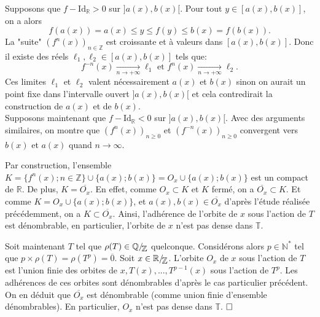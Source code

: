 \documentclass[11pt,a4 paper]{article}
\newcommand{\Tbb}{\mathbb{T}}
\newcommand{\Rbb}{\mathbb{R}}
\newcommand*{\EnsembleQuotient}[2]%
{\ensuremath{%
		#1/\!\raisebox{-.65ex}{\ensuremath{\mathcal{#2}}}}}
\begin{document}
	Supposons que $f - \mathrm{Id_{\mathbb{R}}}>0$ sur $]a(x),b(x)[$. Pour tout $y \in [a(x),b(x)]$, on a alors $$f(a(x))= a(x) \leq y \leq f(y) \leq b(x) =f(b(x)).$$
	La "suite" $(f^n(x))_{n\in \mathbb{Z}}$ est croissante et à valeurs dans $[a(x),b(x)]$. Donc il existe des réels $\ell_1, \ell_2\in [a(x),b(x)]$ tels que: 
	$$f^{-n}(x) \underset{n \to + \infty}{\longrightarrow} \ell_1\text{ et }f^{n}(x) \underset{n \to + \infty}{\longrightarrow} \ell_2.$$
	 Ces limites $\ell_1$ et $\ell_2$ valent nécessairement $a(x)$ et $b(x)$ sinon on aurait un point fixe dans l'intervalle ouvert $]a(x),b(x)[$ et cela contredirait la construction de $a(x)$ et de $b(x)$.\\
	
	Supposons maintenant que $f - \mathrm{Id_{\mathbb{R}}}<0$ sur $]a(x),b(x)[$. Avec des arguments similaires, on montre que $(f^n(x))_{n\geq 0}$ et $(f^{-n}(x))_{n\geq 0}$ convergent vers $b(x)$ et $a(x)$ quand $n \to \infty$.\\
	
	\par Par construction, l'ensemble $K=\lbrace f^n(x); n \in \mathbb{Z}\rbrace \cup \lbrace a(x); b(x)\rbrace = O_x \cup \lbrace a(x); b(x)\rbrace$ est un compact de $\mathbb{R}$. De plus, $K = \overline{O_x}$. En effet, comme $O_x \subset K$ et $K$ fermé, on a $\overline{O_x}\subset K$. Et comme $K=O_x \cup \lbrace a(x); b(x)\rbrace$, et $a(x), b(x) \in \overline{O_x}$ d'après l'étude réalisée précédemment, on a $K \subset \overline{O_x} $. Ainsi, l'adhérence de l'orbite de $x$ sous l'action de $T$ est dénombrable, en particulier, l'orbite de $x$ n'est pas dense dans $\Tbb$.\\
	
	
	
	\par Soit maintenant $T$ tel que $\rho(T) \in \EnsembleQuotient{\mathbb{Q}}{\mathbb{Z}}$ quelconque. Considérons alors $p \in \mathbb{N}^*$ tel que $p \times \rho(T)= \rho(T^p)= \overline{0}$. Soit $x \in \EnsembleQuotient{\Rbb}{\mathbb{Z}}$. L'orbite $O_x$ de $x$ sous l'action de $T$ est l'union finie des orbites de $x, T(x), ... ,T^{p-1}(x)$ sous l'action de $T^p$. Les adhérences de ces orbites sont dénombrables d'après le cas particulier précédent. On en déduit que $\overline{O_x}$ est dénombrable (comme union finie d'ensemble dénombrables). En particulier, $O_x$ n'est pas dense dans $\Tbb$.  $\hfill \square$\\

	
	
	
	
\end{document}
